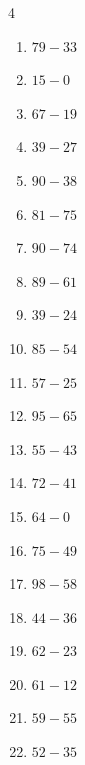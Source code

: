 \begin{multicols}{4}
\begin{enumerate}
  \item $79-33$
        \phantom{$=46$}

  \item $15-0$
        \phantom{$=15$}

  \item $67-19$
        \phantom{$=48$}

  \item $39-27$
        \phantom{$=12$}

  \item $90-38$
        \phantom{$=52$}

  \item $81-75$
        \phantom{$=6$}

  \item $90-74$
        \phantom{$=16$}

  \item $89-61$
        \phantom{$=28$}

  \item $39-24$
        \phantom{$=15$}

  \item $85-54$
        \phantom{$=31$}

  \item $57-25$
        \phantom{$=32$}

  \item $95-65$
        \phantom{$=30$}

  \item $55-43$
        \phantom{$=12$}

  \item $72-41$
        \phantom{$=31$}

  \item $64-0$
        \phantom{$=64$}

  \item $75-49$
        \phantom{$=26$}

\columnbreak %

  \item $98-58$
        \phantom{$=40$}

  \item $44-36$
        \phantom{$=8$}

  \item $62-23$
        \phantom{$=39$}

  \item $61-12$
        \phantom{$=49$}

  \item $59-55$
        \phantom{$=4$}

  \item $52-35$
        \phantom{$=17$}


\end{enumerate}
\end{multicols}
